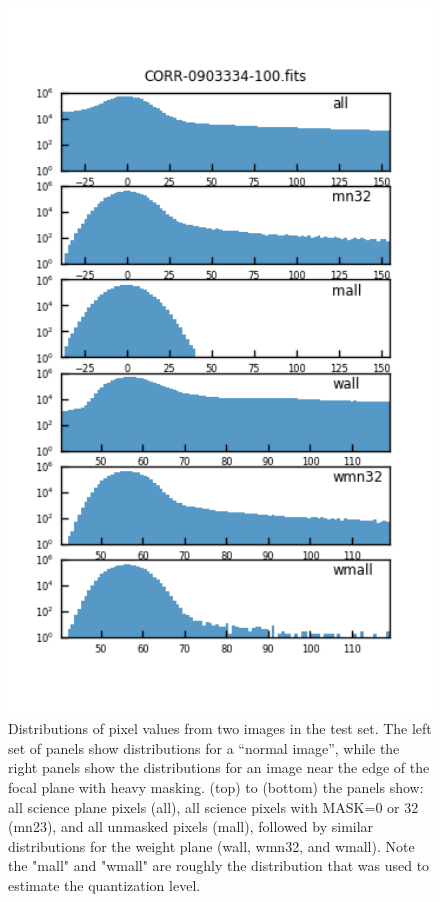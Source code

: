 \begin{figure}
\begin{minipage}{.45\textwidth}
    \includegraphics[width=1.0\textwidth]{figure/imgdist_CORR-0903334-100.fits.png}
  \end{minipage}
\caption{Distributions of pixel values from two images in the test set. The left set of panels show 
distributions for a ``normal image'', while the right panels show the distributions for an image near the edge 
of the focal plane with heavy masking.  (top) to (bottom) the panels show: all science plane pixels (all), 
all science pixels with MASK=0 or 32 (mn23), and all unmasked pixels (mall), followed by similar
distributions for the weight plane (wall, wmn32, and wmall).  Note the "mall" and "wmall" are roughly
the distribution that was used to estimate the quantization level.}
\label{pixel_dist}
\end{figure}

